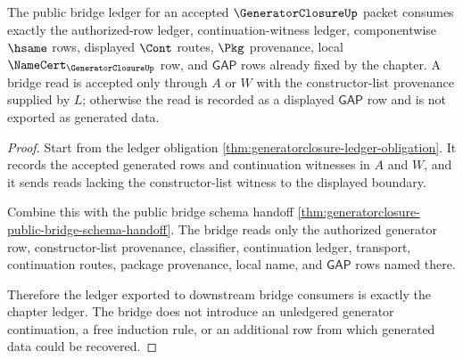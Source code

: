 \begin{theorem}
\label{thm:generatorclosure-bridge-ledger-obligation}
The public bridge ledger for an accepted $\GeneratorClosureUp$ packet consumes exactly the authorized-row ledger, continuation-witness ledger, componentwise $\hsame$ rows, displayed $\Cont$ routes, $\Pkg$ provenance, local $\NameCert_{\GeneratorClosureUp}$ row, and $\mathsf{GAP}$ rows already fixed by the chapter. A bridge read is accepted only through $A$ or $W$ with the constructor-list provenance supplied by $L$; otherwise the read is recorded as a displayed $\mathsf{GAP}$ row and is not exported as generated data.
\end{theorem}
\begin{proof}
Start from the ledger obligation \autoref{thm:generatorclosure-ledger-obligation}. It records the accepted generated rows and continuation witnesses in $A$ and $W$, and it sends reads lacking the constructor-list witness to the displayed boundary.

Combine this with the public bridge schema handoff \autoref{thm:generatorclosure-public-bridge-schema-handoff}. The bridge reads only the authorized generator row, constructor-list provenance, classifier, continuation ledger, transport, continuation routes, package provenance, local name, and $\mathsf{GAP}$ rows named there.

Therefore the ledger exported to downstream bridge consumers is exactly the chapter ledger. The bridge does not introduce an unledgered generator continuation, a free induction rule, or an additional row from which generated data could be recovered.
\end{proof}

